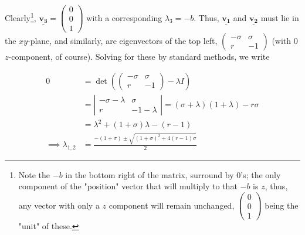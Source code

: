 \documentclass[12pt]{article}
\begin{document}
Clearly\footnote{Note the $-b$ in the bottom right of the matrix, surround by 0's; the only component of the "position" vector that will multiply to that $-b$ is $z$, thus, any vector with only a $z$ component will remain unchanged, $\begin{pmatrix}0\\0\\1\end{pmatrix}$ being the "unit" of these.}, $\underline{\mathbf{v_3}} = \begin{pmatrix}
  0\\
  0\\
  1
\end{pmatrix}$ with a corresponding $\lambda_3 = -b$. Thus, $\underline{\mathbf{v_1}}$ and $\underline{\mathbf{v_2}}$ must lie in the $xy$-plane, and similarly, are eigenvectors of the top left, $\begin{pmatrix}
  -\sigma & \sigma\\
  r & -1\end{pmatrix}$ (with 0 $z$-component, of course). Solving for these by standard methods, we write
  
\begin{align*}
  0 &= \det\left(\begin{pmatrix} 
    - \sigma & \sigma \\
    r & -1
  \end{pmatrix} - \lambda I\right)\\
  &= \left|\begin{matrix}
    -\sigma - \lambda & \sigma\\
    r & -1 - \lambda
  \end{matrix}\right| = (\sigma+\lambda)(1+\lambda) - r\sigma\\
  &= \lambda^2 + (1+\sigma)\lambda- (r-1)\\
  \implies \lambda_{1,2} &= \frac{-(1+\sigma) \pm \sqrt{(1+\sigma)^2 + 4(r-1)\sigma}}{2}
\end{align*}
\end{document}
